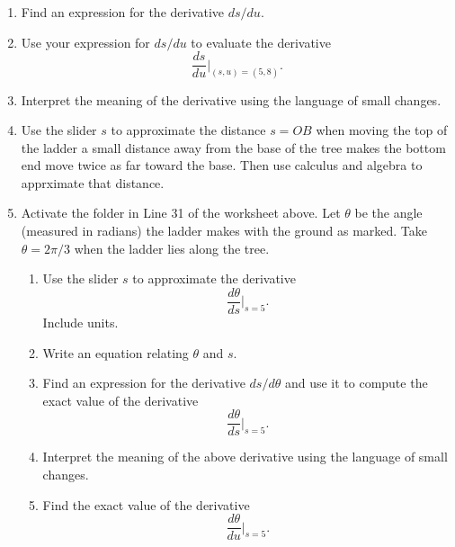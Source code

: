 \documentclass{ximera}
\begin{document}
\begin{question}
\begin{enumerate}
\item Find an expression for the derivative $ds/du$.

\item Use your expression for $ds/du$ to evaluate the derivative
\[
\frac{ds}{du}\Big|_{(s,u) = (5,8)} .
\]

\item Interpret the meaning of the derivative using the language of small changes.

\item Use the slider $s$ to approximate the distance $s=OB$ when moving the top of the ladder a small distance away from the base of the tree makes the bottom end move twice as far toward the base. Then use calculus and algebra to apprximate that distance.

\item Activate the folder in Line 31 of the worksheet above.  Let $\theta$ be the angle (measured in radians) the ladder makes with the ground as marked. Take $\theta=2\pi/3$ when the ladder lies along the tree.

\begin{enumerate}
\item Use the slider $s$ to approximate the derivative 
\[
\frac{d\theta}{ds}\Big|_{s=5} .
\]
Include units.

\item Write an equation relating $\theta$ and $s$.

\item Find an expression for the derivative $ds/d\theta$ and use it to compute the exact value of the derivative
\[
\frac{d\theta}{ds}\Big|_{s=5} .
\]

\item Interpret the meaning of the above derivative using the language of small changes.

\item Find the exact value of the derivative
\[
\frac{d\theta}{du}\Big|_{s=5}.
\]

\end{enumerate}



\end{enumerate}

\end{question}
\end{document}
